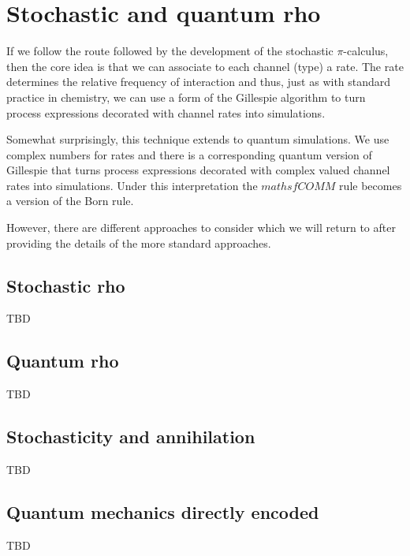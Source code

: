 \section{Stochastic and quantum rho}

If we follow the route followed by the development of the stochastic
$\pi$-calculus, then the core idea is that we can associate to each
channel (type) a rate. The rate determines the relative frequency of
interaction and thus, just as with standard practice in chemistry, we
can use a form of the Gillespie algorithm to turn process expressions
decorated with channel rates into simulations.

Somewhat surprisingly, this technique extends to quantum
simulations. We use complex numbers for rates and there is a
corresponding quantum version of Gillespie that turns process
expressions decorated with complex valued channel rates into
simulations. Under this interpretation the $mathsf{COMM}$ rule becomes
a version of the Born rule.

However, there are different approaches to consider which we will
return to after providing the details of the more standard approaches.

\subsection{Stochastic rho}

TBD

\subsection{Quantum rho}

TBD

\subsection{Stochasticity and annihilation}

TBD

\subsection{Quantum mechanics directly encoded}

TBD
